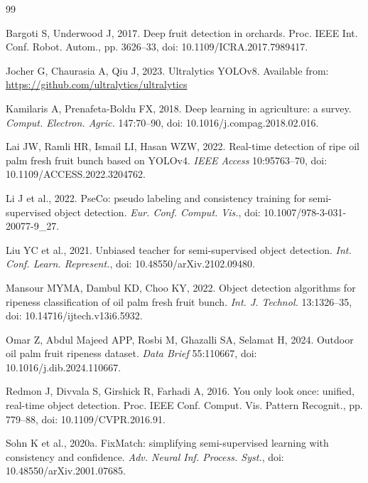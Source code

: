 ﻿\documentclass[12pt]{article}
\begin{document}
\begin{thebibliography}{99}

Bargoti S, Underwood J, 2017. Deep fruit detection in orchards. Proc. IEEE Int. Conf. Robot. Autom., pp. 3626--33, doi: 10.1109/ICRA.2017.7989417.

Jocher G, Chaurasia A, Qiu J, 2023. Ultralytics YOLOv8. Available from: \url{https://github.com/ultralytics/ultralytics}

Kamilaris A, Prenafeta-Boldu FX, 2018. Deep learning in agriculture: a survey. \textit{Comput. Electron. Agric.} 147:70--90, doi: 10.1016/j.compag.2018.02.016.

Lai JW, Ramli HR, Ismail LI, Hasan WZW, 2022. Real-time detection of ripe oil palm fresh fruit bunch based on YOLOv4. \textit{IEEE Access} 10:95763--70, doi: 10.1109/ACCESS.2022.3204762.

Li J et al., 2022. PseCo: pseudo labeling and consistency training for semi-supervised object detection. \textit{Eur. Conf. Comput. Vis.}, doi: 10.1007/978-3-031-20077-9\_27.

Liu YC et al., 2021. Unbiased teacher for semi-supervised object detection. \textit{Int. Conf. Learn. Represent.}, doi: 10.48550/arXiv.2102.09480.

Mansour MYMA, Dambul KD, Choo KY, 2022. Object detection algorithms for ripeness classification of oil palm fresh fruit bunch. \textit{Int. J. Technol.} 13:1326--35, doi: 10.14716/ijtech.v13i6.5932.

Omar Z, Abdul Majeed APP, Rosbi M, Ghazalli SA, Selamat H, 2024. Outdoor oil palm fruit ripeness dataset. \textit{Data Brief} 55:110667, doi: 10.1016/j.dib.2024.110667.

Redmon J, Divvala S, Girshick R, Farhadi A, 2016. You only look once: unified, real-time object detection. Proc. IEEE Conf. Comput. Vis. Pattern Recognit., pp. 779--88, doi: 10.1109/CVPR.2016.91.

Sohn K et al., 2020a. FixMatch: simplifying semi-supervised learning with consistency and confidence. \textit{Adv. Neural Inf. Process. Syst.}, doi: 10.48550/arXiv.2001.07685.


\end{thebibliography}
\end{document}
